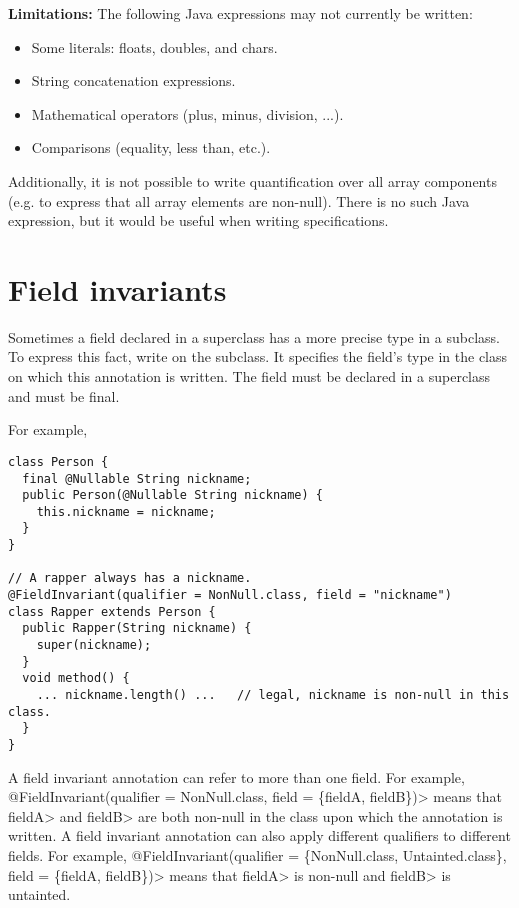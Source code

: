 \textbf{Limitations:}
The following Java expressions may not currently be written:
\begin{itemize}
\item Some literals:  floats, doubles, and chars.
\item String concatenation expressions.
\item Mathematical operators (plus, minus, division, ...).
\item Comparisons (equality, less than, etc.).
\end{itemize}

Additionally, it is not possible to write
quantification over all array components (e.g. to express that all
  array elements are non-null).  There is no such Java expression, but it
  would be useful when writing specifications.

\section{Field invariants\label{field-invariants}}

Sometimes a field declared in a superclass has a more precise type in a
subclass.  To express this fact, write
 on the subclass. It specifies
the field's type in the class on which this annotation is written.
The field must be declared in a superclass and
must be final.


For example,
\begin{Verbatim}
class Person {
  final @Nullable String nickname;
  public Person(@Nullable String nickname) {
    this.nickname = nickname;
  }
}

// A rapper always has a nickname.
@FieldInvariant(qualifier = NonNull.class, field = "nickname")
class Rapper extends Person {
  public Rapper(String nickname) {
    super(nickname);
  }
  void method() {
    ... nickname.length() ...   // legal, nickname is non-null in this class.
  }
}
\end{Verbatim}
 A field invariant annotation can refer to more than one field. For example,
\<@FieldInvariant(qualifier = NonNull.class, field = \{fieldA, fieldB\})> means
that \<fieldA> and \<fieldB> are both non-null in the class upon which the
annotation is written.  A field invariant annotation
can also apply different qualifiers to different fields. For example,
\<@FieldInvariant(qualifier = \{NonNull.class, Untainted.class\}, field =
\{fieldA, fieldB\})> means that \<fieldA> is non-null and \<fieldB> is untainted.

